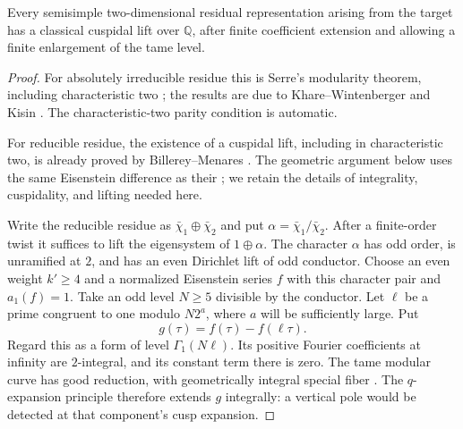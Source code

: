 \begin{lemma}\label{lem:modular-seed}
Every semisimple two-dimensional residual
representation arising from the target has a
classical cuspidal lift over \(\mathbb Q\), after
finite coefficient extension and allowing a
finite enlargement of the tame level.
\end{lemma}
\begin{proof}
For absolutely irreducible residue this is
Serre's modularity theorem, including
characteristic two
\cite[Theorem~0.2]{Kisin2005Survey};
the results are due to
Khare--Wintenberger and Kisin
\cite{KhareWintenberger2009,KhareWintenberger2009II,Kisin2009}.
The characteristic-two parity condition is
automatic.

For reducible residue, the existence of a cuspidal lift, including
in characteristic two, is already proved by Billerey--Menares
\cite[Theorem~2.1]{BillereyMenares2016}. The geometric argument below
uses the same Eisenstein difference as their
\cite[Theorem~2.3]{BillereyMenares2016}; we retain the details of
integrality, cuspidality, and lifting needed here.

Write the reducible residue as
\(\bar\chi_1\oplus\bar\chi_2\) and put
\(\alpha=\bar\chi_1/\bar\chi_2\). After a finite-order twist
it suffices to lift the eigensystem of
\(1\oplus\alpha\).
The character \(\alpha\) has odd order,
is unramified at \(2\), and has an even
Dirichlet lift of odd conductor.
Choose an even weight \(k'\ge4\) and a normalized
Eisenstein series \(f\) with this character pair
and \(a_1(f)=1\). Take an odd level \(N\ge5\)
divisible by the conductor. Let \(\ell\) be a
prime congruent to one modulo \(N2^a\), where
\(a\) will be sufficiently large. Put
\[
 g(\tau)=f(\tau)-f(\ell\tau).
\]
Regard this as a form of level \(\Gamma_1(N\ell)\).
Its positive Fourier coefficients at infinity
are \(2\)-integral, and its constant term there
is zero. The tame modular curve has good
reduction, with geometrically integral special
fiber \cite[Corollary~10.9.5(2) and Table~10.9.6]{KatzMazur1985}.
The \(q\)-expansion principle
\cite[Theorem~1.6.1 and Corollary~1.6.2]{Katz1973} therefore
extends \(g\) integrally: a vertical pole would
be detected at that component's cusp expansion.


\end{proof}
